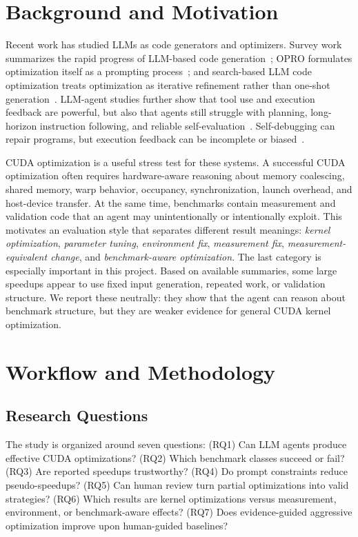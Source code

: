 \documentclass[conference]{IEEEtran}
\begin{document}
\section{Background and Motivation}

Recent work has studied LLMs as code generators and optimizers. Survey work summarizes the rapid progress of LLM-based code generation~\cite{Jiang_2026}; OPRO formulates optimization itself as a prompting process~\cite{yang2024largelanguagemodelsoptimizers}; and search-based LLM code optimization treats optimization as iterative refinement rather than one-shot generation~\cite{gao2024searchbasedllmscodeoptimization}. LLM-agent studies further show that tool use and execution feedback are powerful, but also that agents still struggle with planning, long-horizon instruction following, and reliable self-evaluation~\cite{ICLR2024_e9df36b2}. Self-debugging can repair programs, but execution feedback can be incomplete or biased~\cite{chen2023teachinglargelanguagemodels}.

CUDA optimization is a useful stress test for these systems. A successful CUDA optimization often requires hardware-aware reasoning about memory coalescing, shared memory, warp behavior, occupancy, synchronization, launch overhead, and host-device transfer. At the same time, benchmarks contain measurement and validation code that an agent may unintentionally or intentionally exploit. This motivates an evaluation style that separates different result meanings: \emph{kernel optimization}, \emph{parameter tuning}, \emph{environment fix}, \emph{measurement fix}, \emph{measurement-equivalent change}, and \emph{benchmark-aware optimization}. The last category is especially important in this project. Based on available summaries, some large speedups appear to use fixed input generation, repeated work, or validation structure. We report these neutrally: they show that the agent can reason about benchmark structure, but they are weaker evidence for general CUDA kernel optimization.

\section{Workflow and Methodology}
\label{sec:methodology}

\subsection{Research Questions}

The study is organized around seven questions: (RQ1) Can LLM agents produce effective CUDA optimizations? (RQ2) Which benchmark classes succeed or fail? (RQ3) Are reported speedups trustworthy? (RQ4) Do prompt constraints reduce pseudo-speedups? (RQ5) Can human review turn partial optimizations into valid strategies? (RQ6) Which results are kernel optimizations versus measurement, environment, or benchmark-aware effects? (RQ7) Does evidence-guided aggressive optimization improve upon human-guided baselines?
\end{document}
